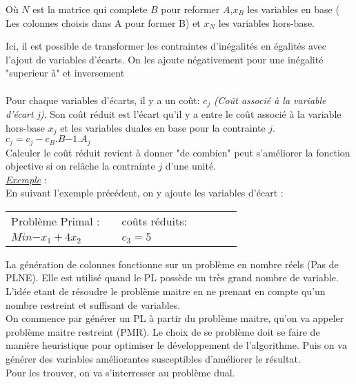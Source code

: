 Où $N$ est la matrice qui complete $B$ pour reformer $A$,$x_B$ les variables en base ( Les colonnes choisis dans A pour former B) et  $x_N$ les variables hors-base.

Ici, il est possible de transformer les contraintes d'inégalités en égalités avec l'ajout de variables d'écarts. On les ajoute négativement pour une inégalité "superieur à" et inversement\\ \\
Pour chaque variables d'écarts, il y a un coût: \textit{$c_j$} \textit{(Coût associé à la variable d'écart j)}.
Son coût réduit est l'écart qu'il y a entre le coût associé à la variable hors-base $x_j$ et les variables duales en base pour la contrainte $j$.\\
$c_j = c_j - c_B.B{-1}.A_j$\\

Calculer le coût réduit revient à donner "de combien" peut s'améliorer la fonction objective si on relâche la contrainte $j$ d'une unité.
\newline
\\
\underline{\textit{Exemple}} : 
\\
En suivant l'exemple précédent, on y ajoute les variables d'écart :
\begin{tabular}{ l p{5 cm}l p{5 cm}  l p{5 cm} l}
Problème Primal : & & 
coûts réduits: \\

$Min{ - x_1 + 4x_2}$ & &  $c_3 = 5$\\ 

\iffalse
$\left\lbrace
\begin{array}{l}
-x_1\geq -7\\
3x_1-2x_2 \geq 4\\
x_1+x_2 \geq 5\\
\end{array}
\right.$ 
& & 
$\left\lbrace
c_4 = 0 \\
c_5 = 4 \\
\right.$
\fi
\end{tabular}

La génération de colonnes fonctionne sur un problème en nombre réels (Pas de PLNE). Elle est utilisé quand le PL possède un très grand nombre de variable. L'idée etant de résoudre le problème maitre en ne prenant en compte qu'un nombre restreint et suffisant de variables.\\

On commence par générer un PL à partir du problème maitre, qu'on va appeler problème maitre restreint (PMR). Le choix de se problème doit se faire de manière heuristique pour optimiser le développement de l'algorithme. Puis on va générer des variables améliorantes susceptibles d'améliorer le résultat.\\

Pour les trouver, on va s'interresser au problème dual.
